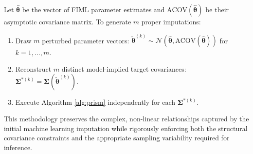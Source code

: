 \documentclass[11pt]{article}
\begin{document}
Let $\hat{\bm{\theta}}$ be the vector of FIML parameter estimates and $\text{ACOV}(\hat{\bm{\theta}})$ be their asymptotic covariance matrix. To generate $m$ proper imputations:
\begin{enumerate}
    \item Draw $m$ perturbed parameter vectors: $\tilde{\bm{\theta}}^{(k)} \sim \mathcal{N}(\hat{\bm{\theta}}, \text{ACOV}(\hat{\bm{\theta}}))$ for $k = 1, \dots, m$.
    \item Reconstruct $m$ distinct model-implied target covariances: $\bm{\Sigma}^{*(k)} = \bm{\Sigma}(\tilde{\bm{\theta}}^{(k)})$.
    \item Execute Algorithm \ref{alg:prism} independently for each $\bm{\Sigma}^{*(k)}$.
\end{enumerate}
This methodology preserves the complex, non-linear relationships captured by the initial machine learning imputation while rigorously enforcing both the structural covariance constraints and the appropriate sampling variability required for inference.
\end{document}
